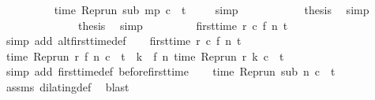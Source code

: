 \begin{isabellebody}
\ \ \ \ \ \ \ \ \isamarkupfalse%
\ {\isacartoucheopen}time\ {\isacharparenleft}{\isacharparenleft}Rep{\isacharunderscore}run\ sub{\isacharparenright}\ m\isactrlsub p\ c{\isacharparenright}\ {\isacharless}\ t{\isacartoucheclose}\ \isamarkupfalse%
\ {\isacharasterisk}\ \isamarkupfalse%
\ simp\isanewline
\ \ \ \ \ \ \ \ \isamarkupfalse%
\ \isamarkupfalse%
\ {\isacharquery}thesis\ \isamarkupfalse%
\ simp\isanewline
\ \ \ \ \ \ \isamarkupfalse%
\isanewline
\ \ \ \ \isacommand{{\isacharbraceright}}\isamarkupfalse%
\ \isamarkupfalse%
\ {\isacharquery}thesis\ \isamarkupfalse%
\ simp\isanewline
\ \ \isamarkupfalse%
\isanewline
\ \ \isamarkupfalse%
\ {\isacharasterisk}{\isacharasterisk}\ \isamarkupfalse%
\ {\isacartoucheopen}first{\isacharunderscore}time\ r\ c\ {\isacharparenleft}f\ n{\isacharparenright}\ t{\isacartoucheclose}\ \isamarkupfalse%
\ {\isacharparenleft}simp\ add{\isacharcolon}\ alt{\isacharunderscore}first{\isacharunderscore}time{\isacharunderscore}def{\isacharparenright}\isanewline
{}\isamarkupfalse%
\isanewline
\ \ \isamarkupfalse%
\ {\isacartoucheopen}first{\isacharunderscore}time\ r\ c\ {\isacharparenleft}f\ n{\isacharparenright}\ t{\isacartoucheclose}\isanewline
\ \ \isamarkupfalse%
\ {\isacharasterisk}{\isacharcolon}{\isacartoucheopen}time\ {\isacharparenleft}{\isacharparenleft}Rep{\isacharunderscore}run\ r{\isacharparenright}\ {\isacharparenleft}f\ n{\isacharparenright}\ c{\isacharparenright}\ {\isacharequal}\ t\ {\isasymand}\ {\isacharparenleft}{\isasymforall}k\ {\isacharless}\ f\ n{\isachardot}\ time\ {\isacharparenleft}{\isacharparenleft}Rep{\isacharunderscore}run\ r{\isacharparenright}\ k\ c{\isacharparenright}\ {\isacharless}\ t{\isacharparenright}{\isacartoucheclose}\isanewline
\ \ \ \ \isamarkupfalse%
\ {\isacharparenleft}simp\ add{\isacharcolon}\ first{\isacharunderscore}time{\isacharunderscore}def\ before{\isacharunderscore}first{\isacharunderscore}time{\isacharparenright}\isanewline
\ \ \isamarkupfalse%
\ {\isacartoucheopen}time\ {\isacharparenleft}{\isacharparenleft}Rep{\isacharunderscore}run\ sub{\isacharparenright}\ n\ c{\isacharparenright}\ {\isacharequal}\ t{\isacartoucheclose}\ \isamarkupfalse%
\ assms\ dilating{\isacharunderscore}def\ \isamarkupfalse%
\ blast\isanewline
\ \ \isamarkupfalse%

\end{isabellebody}
